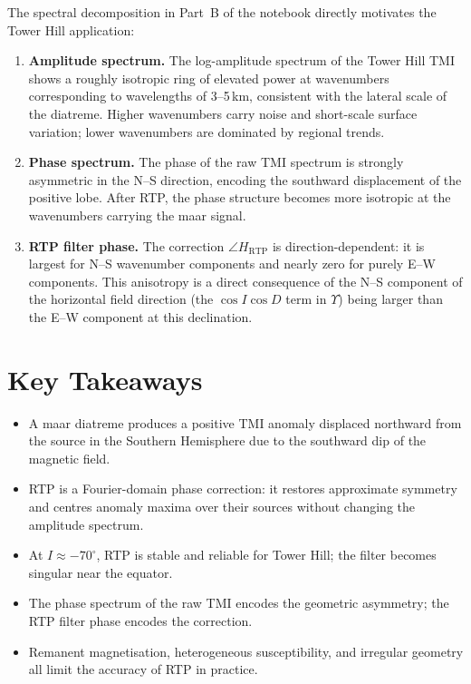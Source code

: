 \documentclass[11pt,a4paper]{article}
\begin{document}
The spectral decomposition in Part~B of the notebook directly motivates
the Tower Hill application:

\begin{enumerate}
  \item \textbf{Amplitude spectrum.}
        The log-amplitude spectrum of the Tower Hill TMI shows a roughly
        isotropic ring of elevated power at wavenumbers corresponding to
        wavelengths of 3--5\,km, consistent with the lateral scale of the
        diatreme.
        Higher wavenumbers carry noise and short-scale surface variation;
        lower wavenumbers are dominated by regional trends.

  \item \textbf{Phase spectrum.}
        The phase of the raw TMI spectrum is strongly asymmetric in the
        N--S direction, encoding the southward displacement of the positive
        lobe.
        After RTP, the phase structure becomes more isotropic at the
        wavenumbers carrying the maar signal.

  \item \textbf{RTP filter phase.}
        The correction $\angle H_\text{RTP}$ is direction-dependent:
        it is largest for N--S wavenumber components and nearly zero
        for purely E--W components.
        This anisotropy is a direct consequence of the N--S component
        of the horizontal field direction (the $\cos I\cos D$ term in
        $\Upsilon$) being larger than the E--W component at this declination.
\end{enumerate}

\section{Key Takeaways}

\begin{itemize}
  \item A maar diatreme produces a positive TMI anomaly displaced northward
        from the source in the Southern Hemisphere due to the southward dip
        of the magnetic field.
  \item RTP is a Fourier-domain phase correction: it restores approximate
        symmetry and centres anomaly maxima over their sources without
        changing the amplitude spectrum.
  \item At $I \approx -70^\circ$, RTP is stable and reliable for Tower Hill;
        the filter becomes singular near the equator.
  \item The phase spectrum of the raw TMI encodes the geometric asymmetry;
        the RTP filter phase encodes the correction.
  \item Remanent magnetisation, heterogeneous susceptibility, and
        irregular geometry all limit the accuracy of RTP in practice.
\end{itemize}
\end{document}
